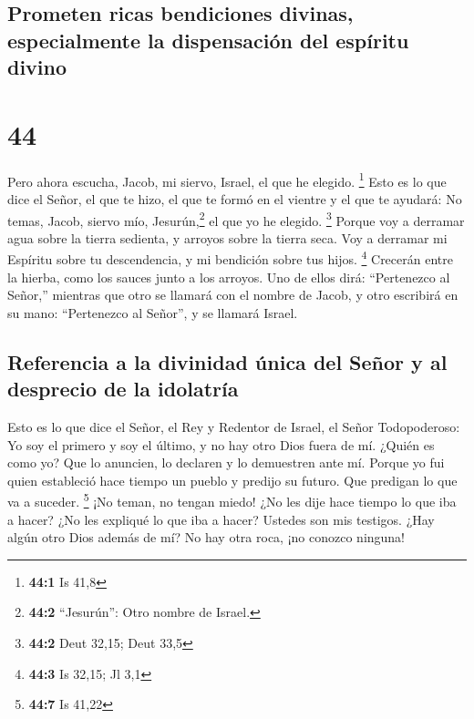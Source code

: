 \hypertarget{prometen-ricas-bendiciones-divinas-especialmente-la-dispensaciuxf3n-del-espuxedritu-divino}{%
\subsection{Prometen ricas bendiciones divinas, especialmente la
dispensación del espíritu
divino}\label{prometen-ricas-bendiciones-divinas-especialmente-la-dispensaciuxf3n-del-espuxedritu-divino}}

\hypertarget{section-43}{%
\section{44}\label{section-43}}

 Pero ahora escucha, Jacob, mi siervo, Israel, el que he
elegido. \footnote{\textbf{44:1} Is 41,8}  Esto es lo que
dice el Señor, el que te hizo, el que te formó en el vientre y el que te
ayudará: No temas, Jacob, siervo mío, Jesurún,\footnote{\textbf{44:2}
  ``Jesurún'': Otro nombre de Israel.} el que yo he elegido. \footnote{\textbf{44:2}
  Deut 32,15; Deut 33,5}  Porque voy a derramar agua sobre
la tierra sedienta, y arroyos sobre la tierra seca. Voy a derramar mi
Espíritu sobre tu descendencia, y mi bendición sobre tus hijos.
\footnote{\textbf{44:3} Is 32,15; Jl 3,1}  Crecerán entre
la hierba, como los sauces junto a los arroyos.  Uno de
ellos dirá: ``Pertenezco al Señor,'' mientras que otro se llamará con el
nombre de Jacob, y otro escribirá en su mano: ``Pertenezco al Señor'', y
se llamará Israel.

\hypertarget{referencia-a-la-divinidad-uxfanica-del-seuxf1or-y-al-desprecio-de-la-idolatruxeda}{%
\subsection{Referencia a la divinidad única del Señor y al desprecio de
la
idolatría}\label{referencia-a-la-divinidad-uxfanica-del-seuxf1or-y-al-desprecio-de-la-idolatruxeda}}

 Esto es lo que dice el Señor, el Rey y Redentor de
Israel, el Señor Todopoderoso: Yo soy el primero y soy el último, y no
hay otro Dios fuera de mí.  ¿Quién es como yo? Que lo
anuncien, lo declaren y lo demuestren ante mí. Porque yo fui quien
estableció hace tiempo un pueblo y predijo su futuro. Que predigan lo
que va a suceder. \footnote{\textbf{44:7} Is 41,22}  ¡No
teman, no tengan miedo! ¿No les dije hace tiempo lo que iba a hacer? ¿No
les expliqué lo que iba a hacer? Ustedes son mis testigos. ¿Hay algún
otro Dios además de mí? No hay otra roca, ¡no conozco ninguna!

